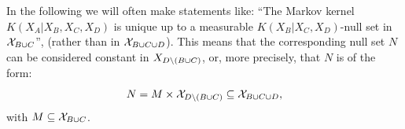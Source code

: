 
\begin{Rem}\label{rem:null-sets}
    In the following we will often make statements like:
    ``The Markov kernel $K(X_A|X_B,X_C,X_D)$ is unique up to a measurable $K(X_B|X_C,X_D)$-null set in $\mathcal{X}_{B\cup C}$'',  (rather than in $\mathcal{X}_{B \cup C \cup D}$). 
This means that the corresponding null set $N$ can be considered constant in $X_{D \setminus (B \cup C)}$, or, more precisely, 
that $N$ is of the form:
\[ N = M \times \mathcal{X}_{D \setminus (B \cup C)}  \subseteq \mathcal{X}_{B \cup C \cup D},  \]
with $M \subseteq \mathcal{X}_{B\cup C}$.
\end{Rem}


